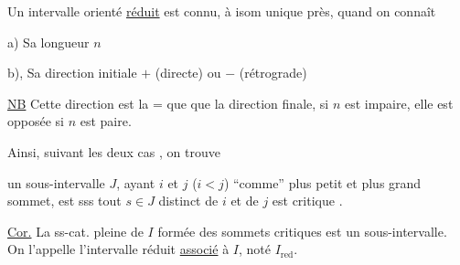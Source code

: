 Un intervalle orienté \uline{réduit} est connu, à isom unique près, quand on connaît

a) Sa longueur $n$

b), Sa direction initiale $+$ (directe) ou $-$ (rétrograde)

\uline{NB} Cette direction est la $\mathord{=}$ que que la direction finale,  si $n$ est impaire, elle est opposée si $n$ est paire.

Ainsi, suivant les deux cas , on trouve



  

 un sous-intervalle $J$, ayant $i$ et $j$ ($i<j$) ``comme'' plus petit et plus grand sommet, est   sss  tout  $s\in J$ distinct de $i$ et de $j$ est critique .

\uline{Cor.} La ss-cat. pleine de $I$ formée des sommets critiques est un sous-intervalle. On l'appelle l'intervalle réduit \uline{associé} à $I$, noté $I_{\mathrm{red}}$.

